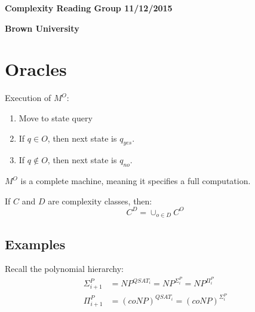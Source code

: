 \documentclass[11pt]{article} %
\begin{document}
\centerline{\LARGE{\bf Complexity Reading Group 11/12/2015}}
\vspace{2mm}
\centerline{\Large {\bf Brown University}}

\section{Oracles}


Execution of $M^O$:
\begin{enumerate}
\item Move to state query
\item If $q \in O$, then next state is $q_{yes}$.
\item If $q \not \in O$, then next state is $q_{no}$.
\end{enumerate}

$M^O$ is a complete machine, meaning it specifies a full computation.


If $C$ and $D$ are complexity classes, then:
\begin{equation}
C^D = \cup_{o \in D} C^O
\end{equation}


\subsection{Examples}

Recall the polynomial hierarchy:
\begin{align*}
\Sigma_{i+1}^P &= NP^{QSAT_i} = NP^{\Sigma_i^P} = NP^{\Pi_i^P} \\
\Pi_{i+1}^P &= (coNP)^{QSAT_i} = (coNP)^{\Sigma_i^P}
\end{align*}
\end{document}
